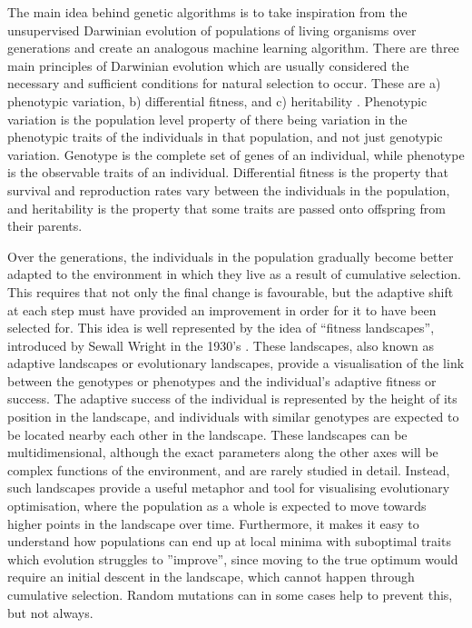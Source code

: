 \documentclass[multicolumn, 10pt]{extarticle}
\begin{document}
The main idea behind genetic algorithms is to take inspiration from the unsupervised Darwinian evolution of populations of living organisms over generations and create an analogous machine learning algorithm. There are three main principles of Darwinian evolution which are usually considered the necessary and sufficient conditions for natural selection to occur. These are a) phenotypic variation, b) differential fitness, and c) heritability \cite{Mitchell}. Phenotypic variation is the population level property of there being variation in the phenotypic traits of the individuals in that population, and not just genotypic variation. Genotype is the complete set of genes of an individual, while phenotype is the observable traits of an individual. Differential fitness is the property that survival and reproduction rates vary between the individuals in the population, and heritability is the property that some traits are passed onto offspring from their parents.

Over the generations, the individuals in the population gradually become better adapted to the environment in which they live as a result of cumulative selection. This requires that not only the final change is favourable, but the adaptive shift at each step must have provided an improvement in order for it to have been selected for.  This idea is well represented by the idea of ``fitness landscapes'', introduced by Sewall Wright in the 1930's \cite{Sewall}. These landscapes, also known as adaptive landscapes or evolutionary landscapes, provide a visualisation of the link between the genotypes or phenotypes and the individual's adaptive fitness or success. The adaptive success of the individual is represented by the height of its position in the landscape, and individuals with similar genotypes are expected to be located nearby each other in the landscape. These landscapes can be multidimensional, although the exact parameters along the other axes will be complex functions of the environment, and are rarely studied in detail. Instead, such landscapes provide a useful metaphor and tool for visualising evolutionary optimisation, where the population as a whole is expected to move towards higher points in the landscape over time. Furthermore, it makes it easy to understand how populations can end up at local minima with suboptimal traits which evolution struggles to ''improve'', since moving to the true optimum would require an initial descent in the landscape, which cannot happen through cumulative selection. Random mutations can in some cases help to prevent this, but not always.
\end{document}
